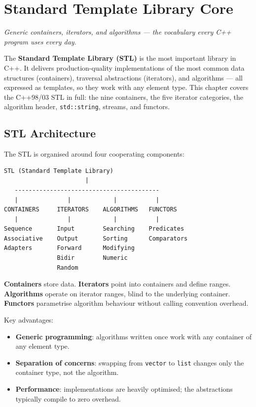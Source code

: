 \chapter{Standard Template Library Core}
\label{ch:stl-core}

\textit{Generic containers, iterators, and algorithms --- the vocabulary every C++ program uses every day.}

The \textbf{Standard Template Library (STL)} is the most important library in C++. It delivers production-quality implementations of the most common data structures (containers), traversal abstractions (iterators), and algorithms --- all expressed as templates, so they work with any element type. This chapter covers the C++98/03 STL in full: the nine containers, the five iterator categories, the algorithm header, \texttt{std::string}, streams, and functors.

\section{STL Architecture}
\label{sec:stl-architecture}

The STL is organised around four cooperating components:

\begin{lstlisting}[language={},caption={STL component tree}]
          STL (Standard Template Library)
                       |
   -----------------------------------------
   |              |            |           |
CONTAINERS     ITERATORS    ALGORITHMS   FUNCTORS
   |              |            |           |
Sequence       Input        Searching    Predicates
Associative    Output       Sorting      Comparators
Adapters       Forward      Modifying
               Bidir        Numeric
               Random
\end{lstlisting}

\textbf{Containers} store data. \textbf{Iterators} point into containers and define ranges. \textbf{Algorithms} operate on iterator ranges, blind to the underlying container. \textbf{Functors} parametrise algorithm behaviour without calling convention overhead.

Key advantages:
\begin{itemize}
    \item \textbf{Generic programming}: algorithms written once work with any container of any element type.
    \item \textbf{Separation of concerns}: swapping from \texttt{vector} to \texttt{list} changes only the container type, not the algorithm.
    \item \textbf{Performance}: implementations are heavily optimised; the abstractions typically compile to zero overhead.
\end{itemize}

